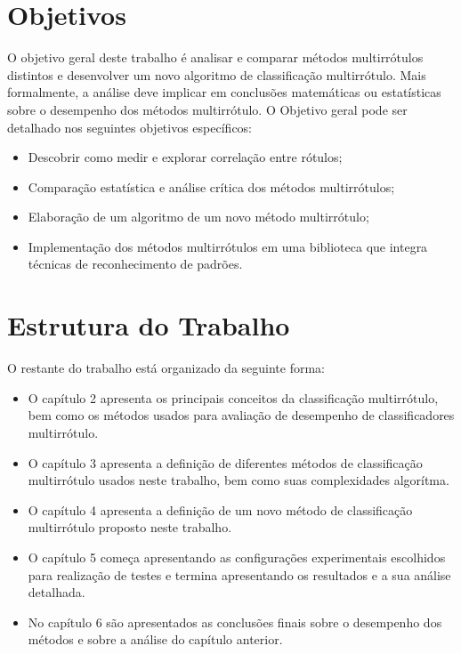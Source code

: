 \section{Objetivos}
O objetivo geral deste trabalho é analisar e comparar métodos multirrótulos distintos e 
desenvolver um novo algoritmo de classificação multirrótulo.
Mais formalmente, a análise deve implicar em conclusões matemáticas ou estatísticas sobre o desempenho dos métodos multirrótulo.
O Objetivo geral pode ser detalhado nos seguintes objetivos específicos:
\begin{itemize}
 \item Descobrir como medir e explorar correlação entre rótulos;
 \item Comparação estatística e análise crítica dos métodos multirrótulos;
 \item Elaboração de um algoritmo de um novo método multirrótulo;
 \item Implementação dos métodos multirrótulos em uma biblioteca que integra técnicas de reconhecimento de padrões.
\end{itemize}


\section{Estrutura do Trabalho}
O restante do trabalho está organizado da seguinte forma:
\begin{itemize}
 \item O capítulo 2 apresenta os principais conceitos da classificação multirrótulo, bem como
 os métodos usados para avaliação de desempenho de classificadores multirrótulo.
 \item O capítulo 3 apresenta a definição de diferentes métodos de classificação multirrótulo usados neste trabalho,
 bem como suas complexidades algorítma.
 \item O capítulo 4 apresenta a definição de um novo método de classificação multirrótulo proposto neste trabalho.
 \item O capítulo 5 começa apresentando as configurações experimentais escolhidos para realização de testes e termina
 apresentando os resultados e a sua análise detalhada.
 \item No capítulo 6 são apresentados as conclusões finais sobre o desempenho dos métodos e sobre a análise do capítulo anterior.
\end{itemize}


